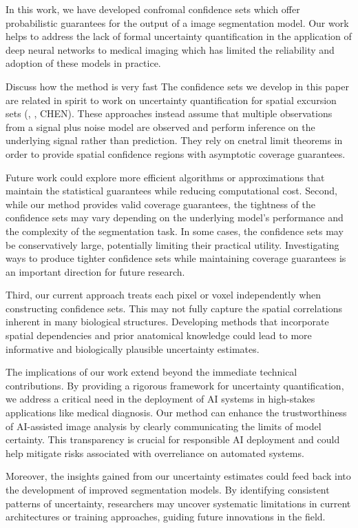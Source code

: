 In this work, we have developed confromal confidence sets which offer probabilistic guarantees for the output of a image segmentation model. Our work helps to address the lack of formal uncertainty quantification in the application of deep neural networks to medical imaging which has limited the reliability and adoption of these models in practice.

Discuss how the method is very fast
The confidence sets we develop in this paper are related in spirit to work on uncertainty quantification for spatial excursion sets (\cite{Bowring2019}, \cite{Mejia2019}, CHEN). These approaches instead assume that multiple observations from a signal plus noise model are observed and perform inference on the underlying signal rather than prediction. They rely on cnetral limit theorems in order to provide spatial confidence regions with asymptotic coverage guarantees. 


Future work could explore more efficient algorithms or approximations that maintain the statistical guarantees while reducing computational cost.
Second, while our method provides valid coverage guarantees, the tightness of the confidence sets may vary depending on the underlying model's performance and the complexity of the segmentation task. In some cases, the confidence sets may be conservatively large, potentially limiting their practical utility. Investigating ways to produce tighter confidence sets while maintaining coverage guarantees is an important direction for future research.

Third, our current approach treats each pixel or voxel independently when constructing confidence sets. This may not fully capture the spatial correlations inherent in many biological structures. Developing methods that incorporate spatial dependencies and prior anatomical knowledge could lead to more informative and biologically plausible uncertainty estimates.

The implications of our work extend beyond the immediate technical contributions. By providing a rigorous framework for uncertainty quantification, we address a critical need in the deployment of AI systems in high-stakes applications like medical diagnosis. Our method can enhance the trustworthiness of AI-assisted image analysis by clearly communicating the limits of model certainty. This transparency is crucial for responsible AI deployment and could help mitigate risks associated with overreliance on automated systems.

Moreover, the insights gained from our uncertainty estimates could feed back into the development of improved segmentation models. By identifying consistent patterns of uncertainty, researchers may uncover systematic limitations in current architectures or training approaches, guiding future innovations in the field.

